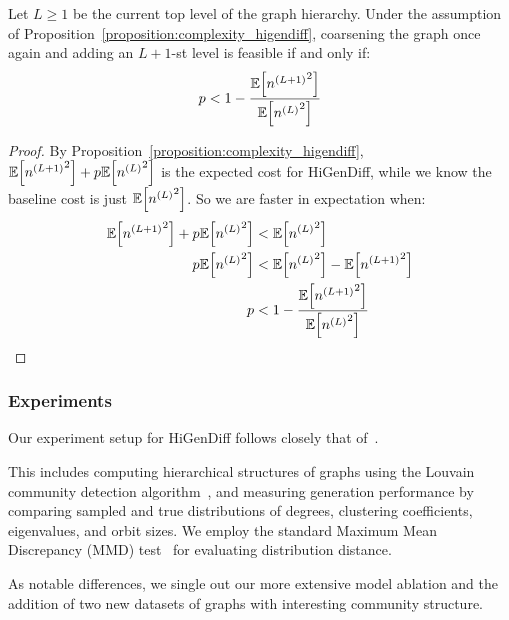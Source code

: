 \begin{proposition}
\label{proposition:feasibility_higendiff}
     Let $L \geq 1$ be the current top level of the graph hierarchy. Under the assumption of Proposition~\ref{proposition:complexity_higendiff}, coarsening the graph once again and adding an $L+1$-st level is feasible if and only if:
     \begin{equation}
            p < 1 - \frac{\mathbb{E}\mathopen{}\left[{n^{\mathopen{}\left(L+1\right)}}^2\right]}{\mathbb{E}\mathopen{}\left[{n^{\mathopen{}\left(L\right)}}^2\right]}
     \end{equation}
\end{proposition}
\begin{proof}
    By Proposition~\ref{proposition:complexity_higendiff}, $\mathbb{E}\mathopen{}\left[{n^{\mathopen{}\left(L+1\right)}}^2\right] + p \mathbb{E}\mathopen{}\left[{n^{\mathopen{}\left(L\right)}}^2\right]$ is the expected cost for HiGenDiff, while we know the baseline cost is just $\mathbb{E}\mathopen{}\left[{n^{\mathopen{}\left(L\right)}}^2\right]$. So we are faster in expectation when:
    \begin{align}
        \begin{split}
            \mathbb{E}\mathopen{}\left[{n^{\mathopen{}\left(L+1\right)}}^2\right] + p \mathbb{E}\mathopen{}\left[{n^{\mathopen{}\left(L\right)}}^2\right] &< \mathbb{E}\mathopen{}\left[{n^{\mathopen{}\left(L\right)}}^2\right] \\
            p \mathbb{E}\mathopen{}\left[{n^{\mathopen{}\left(L\right)}}^2\right] &< \mathbb{E}\mathopen{}\left[{n^{\mathopen{}\left(L\right)}}^2\right] - \mathbb{E}\mathopen{}\left[{n^{\mathopen{}\left(L+1\right)}}^2\right]  \\
            p &< 1 - \frac{\mathbb{E}\mathopen{}\left[{n^{\mathopen{}\left(L+1\right)}}^2\right]}{\mathbb{E}\mathopen{}\left[{n^{\mathopen{}\left(L\right)}}^2\right]}
        \end{split}
    \end{align}
\end{proof}

\subsubsection{Experiments}

Our experiment setup for HiGenDiff follows closely that of~\cite{karami_multi-resolution_2024}. 

This includes computing hierarchical structures of graphs using the Louvain community detection algorithm~\cite{blondel_fast_2008}, and measuring generation performance by comparing sampled and true distributions of degrees, clustering coefficients, eigenvalues, and orbit sizes. We employ the standard Maximum Mean Discrepancy (MMD) test~\cite{gretton_kernel_2012} for evaluating distribution distance. 

As notable differences, we single out our more extensive model ablation and the addition of two new datasets of graphs with interesting community structure.

